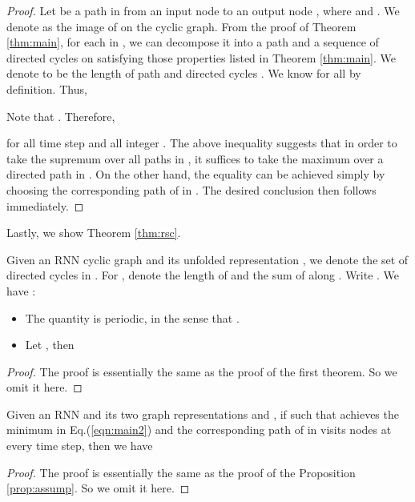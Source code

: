 \begin{proof}
Let  be a path in  from an input node  to an output node , where  and . We denote 
  as the image of  on the cyclic graph. 
From the proof of Theorem \ref{thm:main}, for each  in , we can decompose it into a path  and a sequence of directed cycles  on
   satisfying those properties listed in Theorem \ref{thm:main}.
We denote  to be the length of
  path  and directed cycles . We know  for all  by definition. Thus,

Note that . Therefore,

for all time step  and all integer . The above inequality suggests that in order to take the supremum over all paths in , it suffices to take the maximum over a directed path in . On the other hand, the equality can be achieved simply by choosing the corresponding path of  in . The desired conclusion then follows immediately.

\end{proof}

Lastly, we show Theorem \ref{thm:rsc}.

\begin{thm}
\label{thm:main2}
  Given an RNN cyclic graph and its unfolded representation , we denote  the set of directed
  cycles in . For , denote  the length of  and  the sum of
   along . Write . We have :
  \begin{itemize}
    \item  The quantity  is periodic, in the sense that .
    
    \item Let , then
    
  \end{itemize}
\end{thm}
\begin{proof}
  The proof is essentially the same as the proof of the first theorem. So we
  omit it here. 
\end{proof}

\begin{proposition}
\label{prop:assump2}
  Given an RNN and its two graph representations  and
  , if  such that
    achieves the minimum in Eq.(\ref{eqn:main2}) and  the
  corresponding path of  in  visits nodes at every time step,
  then we have
  
\end{proposition}
\begin{proof}
  The proof is essentially the same as the proof of the Proposition \ref{prop:assump}. So we
  omit it here. 
\end{proof}


